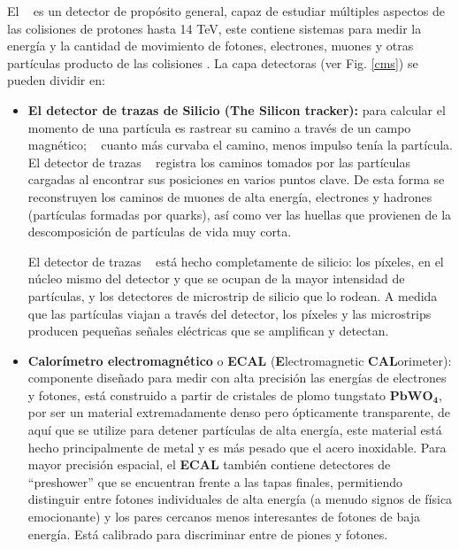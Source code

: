 El \CMS ~ es un detector de propósito general, capaz de estudiar múltiples aspectos de las colisiones de protones hasta 14 TeV, este contiene sistemas para medir la energía y la cantidad de movimiento de fotones, electrones, muones y otras partículas producto de las colisiones \citep{cms_1}. La capa detectoras (ver Fig. \ref{cms}) se pueden dividir en: 
\begin{itemize}
\item  \textbf{El detector de trazas de Silicio (The Silicon tracker):} para calcular el momento de una partícula es rastrear su camino a través de un campo magnético; ~ cuanto más curvaba el camino, menos impulso tenía la partícula. El detector de trazas \CMS ~ registra los caminos tomados por las partículas cargadas al encontrar sus posiciones en varios puntos clave. De esta forma se reconstruyen los caminos de muones de alta energía, electrones y hadrones (partículas formadas por quarks), así como ver las huellas que provienen de la descomposición de partículas de vida muy corta.

El detector de trazas \CMS ~ está hecho completamente de silicio: los píxeles, en el núcleo mismo del detector y que se ocupan de la mayor intensidad de partículas, y los detectores de microstrip de silicio que lo rodean. A medida que las partículas viajan a través del detector, los píxeles y las microstrips producen pequeñas señales eléctricas que se amplifican y detectan. %



\item \textbf{Calorímetro electromagnético} o \textbf{ECAL} (\textbf{E}lectromagnetic \textbf{CAL}orimeter): componente diseñado para medir con alta precisión las energías de electrones y fotones, está construido a partir de cristales de plomo tungstato $\mathbf{PbWO_4}$, por ser un material extremadamente denso pero ópticamente transparente, de aquí que se utilize para detener partículas de alta energía, este material está hecho principalmente de metal y es más pesado que el acero inoxidable. Para mayor precisión espacial, el \textbf{ECAL} también contiene detectores de ``preshower'' que se encuentran frente a las tapas finales, permitiendo distinguir entre fotones individuales de alta energía (a menudo signos de física emocionante) y los pares cercanos menos interesantes de fotones de baja energía. Está calibrado para discriminar entre de piones y fotones.


\end{itemize}
